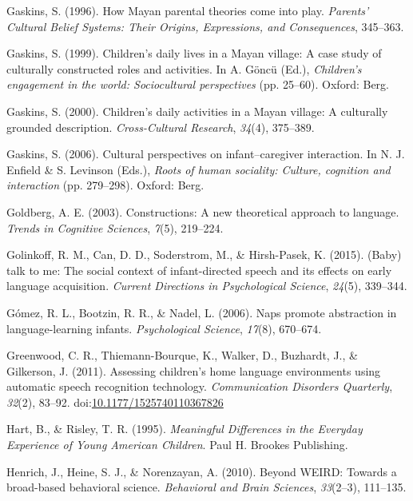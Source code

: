 \documentclass[floatsintext,man]{apa6}
\theoremstyle{definition}
\theoremstyle{definition}
\theoremstyle{definition}
\theoremstyle{remark}
\begin{document}
\hypertarget{ref-gaskins1996how}{}
Gaskins, S. (1996). How Mayan parental theories come into play.
\emph{Parents' Cultural Belief Systems: Their Origins, Expressions, and
Consequences}, 345--363.

\hypertarget{ref-gaskins1999childrens}{}
Gaskins, S. (1999). Children's daily lives in a Mayan village: A case
study of culturally constructed roles and activities. In A. Göncü (Ed.),
\emph{Children's engagement in the world: Sociocultural perspectives}
(pp. 25--60). Oxford: Berg.

\hypertarget{ref-gaskins2000childrens}{}
Gaskins, S. (2000). Children's daily activities in a Mayan village: A
culturally grounded description. \emph{Cross-Cultural Research},
\emph{34}(4), 375--389.

\hypertarget{ref-gaskins2006cultural}{}
Gaskins, S. (2006). Cultural perspectives on infant--caregiver
interaction. In N. J. Enfield \& S. Levinson (Eds.), \emph{Roots of
human sociality: Culture, cognition and interaction} (pp. 279--298).
Oxford: Berg.

\hypertarget{ref-goldberg2003constructions}{}
Goldberg, A. E. (2003). Constructions: A new theoretical approach to
language. \emph{Trends in Cognitive Sciences}, \emph{7}(5), 219--224.

\hypertarget{ref-golinkoff2015baby}{}
Golinkoff, R. M., Can, D. D., Soderstrom, M., \& Hirsh-Pasek, K. (2015).
(Baby) talk to me: The social context of infant-directed speech and its
effects on early language acquisition. \emph{Current Directions in
Psychological Science}, \emph{24}(5), 339--344.

\hypertarget{ref-gomez2006naps}{}
Gómez, R. L., Bootzin, R. R., \& Nadel, L. (2006). Naps promote
abstraction in language-learning infants. \emph{Psychological Science},
\emph{17}(8), 670--674.

\hypertarget{ref-greenwood2011assessing}{}
Greenwood, C. R., Thiemann-Bourque, K., Walker, D., Buzhardt, J., \&
Gilkerson, J. (2011). Assessing children's home language environments
using automatic speech recognition technology. \emph{Communication
Disorders Quarterly}, \emph{32}(2), 83--92.
doi:\href{https://doi.org/10.1177/1525740110367826}{10.1177/1525740110367826}

\hypertarget{ref-hart1995meaningful}{}
Hart, B., \& Risley, T. R. (1995). \emph{Meaningful Differences in the
Everyday Experience of Young American Children}. Paul H. Brookes
Publishing.

\hypertarget{ref-henrich2010beyond}{}
Henrich, J., Heine, S. J., \& Norenzayan, A. (2010). Beyond WEIRD:
Towards a broad-based behavioral science. \emph{Behavioral and Brain
Sciences}, \emph{33}(2--3), 111--135.
\end{document}
